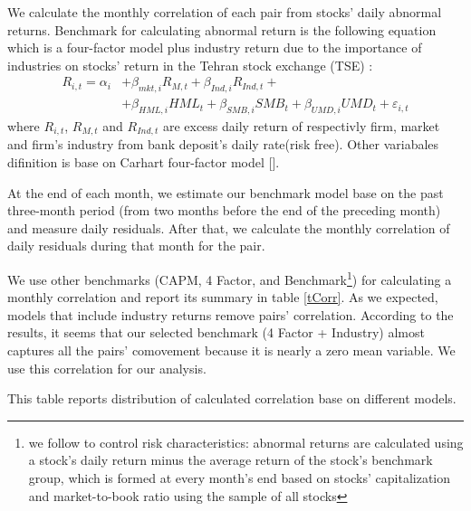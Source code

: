 	We calculate the monthly correlation of each pair from stocks' daily abnormal returns. Benchmark for calculating abnormal return is the following equation which is a four-factor model plus industry return due to the importance of industries on stocks' return in the Tehran stock exchange (TSE) :
	\begin{equation}
		\begin{split}
			R_{i,t} =\alpha _{i}&+\beta _{mkt,i}{\mathit {R}}_{M,t} + \beta_{Ind,i}{\mathit {R}}_{Ind,t} + \\
			&+\beta _{HML,i}{\mathit {HML}}_{t}+\beta _{SMB,i}{\mathit {SMB}}_{t}+\beta _{UMD,i}{\mathit {UMD}}_{t}+ \varepsilon_{i,t}
		\end{split}
		\label{e5Factor}
	\end{equation}
	where $ R_{i,t} $, $ R_{M,t} $ and $ R_{Ind,t} $ are excess daily return of respectivly  firm, market and firm's industry from bank deposit's daily rate(risk free). Other variabales difinition is base on Carhart four-factor model [\cite{Carhart4Factor}].
	
	At the end of each month, we estimate our benchmark model base on the past three-month period (from two months before the end of the preceding month) and measure daily residuals.  After that, we calculate the monthly correlation of daily residuals during that month for the pair.
	
	We use other benchmarks (CAPM, 4 Factor, and Benchmark\footnote{we follow \cite{daniel1997measuring} to control risk characteristics: abnormal returns are calculated using a stock’s daily return minus the average return of
	the stock’s benchmark group, which is formed at every month’s end based on stocks’ capitalization and market-to-book ratio using the sample of all stocks}) for calculating a monthly correlation and report its summary in table \ref{tCorr}. 
	As we expected,  models that include industry returns remove pairs' correlation. According to the results, it seems that our selected benchmark (4 Factor + Industry) almost captures all the pairs' comovement because it is nearly a zero mean variable. We use this correlation for our analysis.
	
	
{	\begin{table}[htbp]
		\centering
		\caption{\footnotesize This table reports distribution of calculated correlation base on different models.}
		\label{tCorr}
		\resizebox{0.7\textwidth}{!}
		{
			
		}
	\end{table}}



